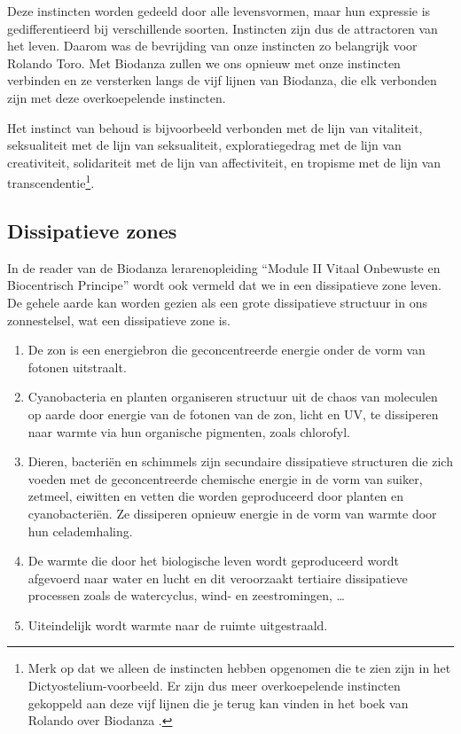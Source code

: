 \documentclass[
  11pt,
]{book}
\begin{document}
Deze instincten worden gedeeld door alle levensvormen, maar hun expressie is gedifferentieerd bij verschillende soorten. Instincten zijn dus de attractoren van het leven. Daarom was de bevrijding van onze instincten zo belangrijk voor Rolando Toro. Met Biodanza zullen we ons opnieuw met onze instincten verbinden en ze versterken langs de vijf lijnen van Biodanza, die elk verbonden zijn met deze overkoepelende instincten.

Het instinct van behoud is bijvoorbeeld verbonden met de lijn van vitaliteit, seksualiteit met de lijn van seksualiteit, exploratiegedrag met de lijn van creativiteit, solidariteit met de lijn van affectiviteit, en tropisme met de lijn van transcendentie\footnote{Merk op dat we alleen de instincten hebben opgenomen die te zien zijn in het Dictyostelium-voorbeeld. Er zijn dus meer overkoepelende instincten gekoppeld aan deze vijf lijnen die je terug kan vinden in het boek van Rolando over Biodanza \citep{toro2008}.}.

\hypertarget{dissipatieve-zones}{%
\subsection{Dissipatieve zones}\label{dissipatieve-zones}}

In de reader van de Biodanza lerarenopleiding ``Module II Vitaal Onbewuste en Biocentrisch Principe'' wordt ook vermeld dat we in een dissipatieve zone leven. De gehele aarde kan worden gezien als een grote dissipatieve structuur in ons zonnestelsel, wat een dissipatieve zone is.

\begin{enumerate}
\def\labelenumi{\arabic{enumi}.}
\item
  De zon is een energiebron die geconcentreerde energie onder de vorm van fotonen uitstraalt.
\item
  Cyanobacteria en planten organiseren structuur uit de chaos van moleculen op aarde door energie van de fotonen van de zon, licht en UV, te dissiperen naar warmte via hun organische pigmenten, zoals chlorofyl.
\item
  Dieren, bacteriën en schimmels zijn secundaire dissipatieve structuren die zich voeden met de geconcentreerde chemische energie in de vorm van suiker, zetmeel, eiwitten en vetten die worden geproduceerd door planten en cyanobacteriën. Ze dissiperen opnieuw energie in de vorm van warmte door hun celademhaling.
\item
  De warmte die door het biologische leven wordt geproduceerd wordt afgevoerd naar water en lucht en dit veroorzaakt tertiaire dissipatieve processen zoals de watercyclus, wind- en zeestromingen, \ldots{}
\item
  Uiteindelijk wordt warmte naar de ruimte uitgestraald.
\end{enumerate}
\end{document}
